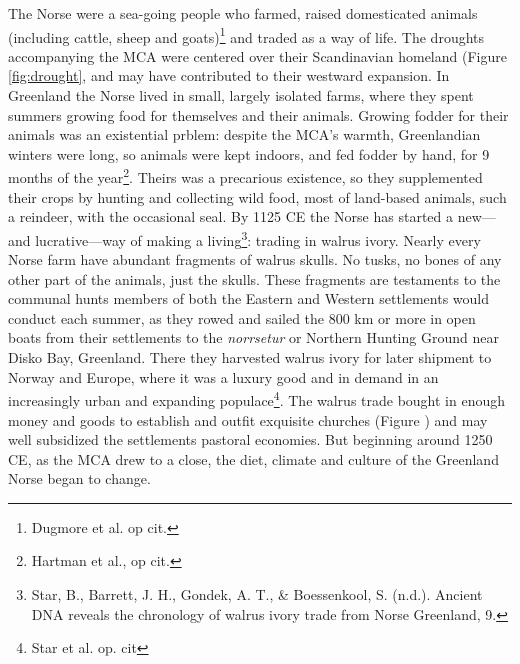 The Norse were a sea-going people who farmed, raised domesticated animals (including cattle, sheep and goats)\footnote{Dugmore et al. op cit.} and traded as a way of life. The droughts accompanying the MCA were centered over their Scandinavian homeland (Figure \ref{fig:drought}, and may have contributed to their westward expansion. In Greenland the Norse lived in small, largely isolated farms, where they spent summers growing food for themselves and their animals. Growing fodder for their animals was an existential prblem: despite the MCA's warmth, Greenlandian winters were long, so animals were kept indoors, and fed fodder by hand, for 9 months of the year\footnote{Hartman et al., op cit.}. Theirs was a precarious existence, so they supplemented their crops by hunting and collecting wild food, most of land-based animals, such a reindeer, with the occasional seal. By 1125 CE the Norse has started a new---and lucrative---way of making a living\footnote{Star, B., Barrett, J. H., Gondek, A. T., \& Boessenkool, S. (n.d.). Ancient DNA reveals the chronology of walrus ivory trade from Norse Greenland, 9.}: trading in walrus ivory. Nearly every Norse farm have abundant fragments of walrus skulls. No tusks, no bones of any other part of the animals, just the skulls. These fragments are testaments to the communal hunts members of both the Eastern and Western settlements would conduct each summer, as they rowed and sailed the 800 km or more in open boats from their settlements to the \textit{nor\dh rsetur} or Northern Hunting Ground near Disko Bay, Greenland. There they harvested walrus ivory for later shipment to Norway and Europe, where it was a luxury good and in demand in an increasingly urban and expanding populace\footnote{Star et al. op. cit}. The walrus trade bought in enough money and goods to establish and outfit exquisite churches (Figure ) and may well subsidized the settlements pastoral economies. But beginning around 1250 CE, as the MCA drew to a close, the diet, climate and culture of the Greenland Norse began to change. \\

